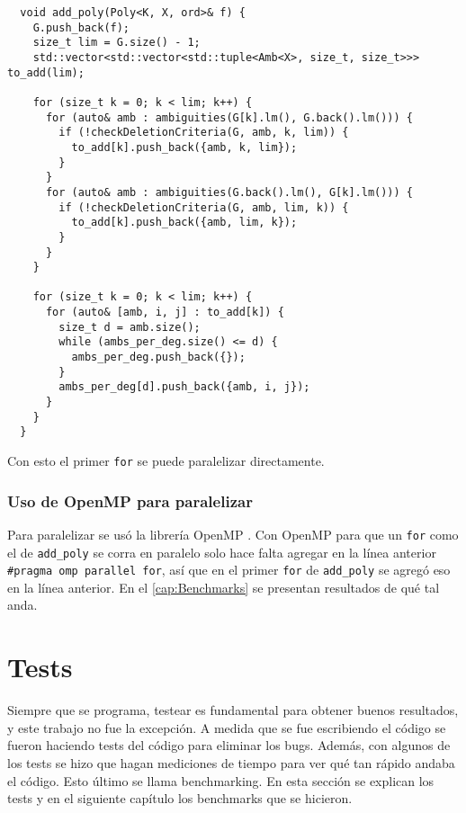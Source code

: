 \documentclass[12pt]{report}
\theoremstyle{customstyle}
\theoremstyle{factstyle}
\begin{document}
\begin{verbatim}
  void add_poly(Poly<K, X, ord>& f) {
    G.push_back(f);
    size_t lim = G.size() - 1;
    std::vector<std::vector<std::tuple<Amb<X>, size_t, size_t>>> to_add(lim);

    for (size_t k = 0; k < lim; k++) {
      for (auto& amb : ambiguities(G[k].lm(), G.back().lm())) {
        if (!checkDeletionCriteria(G, amb, k, lim)) {
          to_add[k].push_back({amb, k, lim});
        }
      }
      for (auto& amb : ambiguities(G.back().lm(), G[k].lm())) {
        if (!checkDeletionCriteria(G, amb, lim, k)) {
          to_add[k].push_back({amb, lim, k});
        }
      }
    }

    for (size_t k = 0; k < lim; k++) {
      for (auto& [amb, i, j] : to_add[k]) {
        size_t d = amb.size();
        while (ambs_per_deg.size() <= d) {
          ambs_per_deg.push_back({});
        }
        ambs_per_deg[d].push_back({amb, i, j});
      }
    }
  }
\end{verbatim}

Con esto el primer \texttt{for} se puede paralelizar directamente.

\subsection{Uso de OpenMP para paralelizar}

Para paralelizar se usó la librería OpenMP \cite{lib:openmp}. Con OpenMP para que un \texttt{for} como el de \texttt{add\_poly} se corra en paralelo solo hace falta agregar en la línea anterior \texttt{\#pragma omp parallel for}, así que en el primer \texttt{for} de \texttt{add\_poly} se agregó eso en la línea anterior. En el \cref{cap:Benchmarks} se presentan resultados de qué tal anda.


\chapter{Tests}\label{cap:Tests}

Siempre que se programa, testear es fundamental para obtener buenos resultados, y este trabajo no fue la excepción. A medida que se fue escribiendo el código se fueron haciendo tests del código para eliminar los bugs. Además, con algunos de los tests se hizo que hagan mediciones de tiempo para ver qué tan rápido andaba el código. Esto último se llama benchmarking. En esta sección se explican los tests y en el siguiente capítulo los benchmarks que se hicieron.
\end{document}
